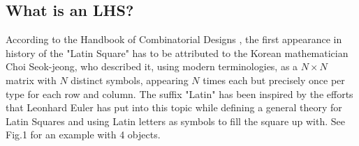 \documentclass[12pt]{extarticle}
\begin{document}
\subsection{What is an LHS?}
\label{subsec:what_is_an_lhs}
According to the Handbook of Combinatorial Designs , the first appearance in history of the "Latin Square" has to be attributed to the Korean mathematician Choi Seok-jeong, who described it, using modern terminologies, as a $N \times N$ matrix with $N$ distinct symbols, appearing $N$ times each but precisely once per type for each row and column. The suffix "Latin" has been inspired by the efforts that Leonhard Euler has put into this topic while defining a general theory for Latin Squares  and using Latin letters as symbols to fill the square up with. See Fig.1 for an example with 4 objects.
\end{document}
